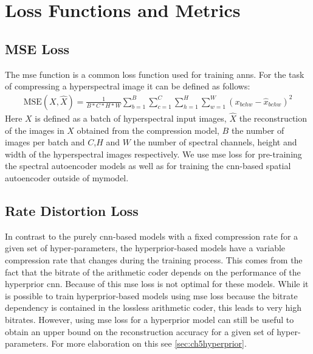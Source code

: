 \section{Loss Functions and Metrics}

\subsection{MSE Loss}
The \ac{mse} function is a common loss function used for training \acp{ann}. For the task of compressing a hyperspectral image it can be defined as follows:
\begin{align}
\text{MSE}(X,\hat{X}) = \frac{1}{B*C*H*W} \sum_{b=1}^{B}\sum_{c=1}^{C}\sum_{h=1}^H\sum_{w=1}^W (x_{bchw} - \hat{x}_{bchw})^2
\end{align}
Here $X$ is defined as a batch of hyperspectral input images, $\hat{X}$ the reconstruction of the images in $X$ obtained from the compression model, $B$ the number of images per batch and $C$,$H$ and $W$ the number of spectral channels, height and width of the hyperspectral images respectively.
We use \ac{mse} loss for pre-training the spectral autoencoder models as well as for training the \ac{cnn}-based spatial autoencoder outside of \ac{mymodel}.

\subsection{Rate Distortion Loss\label{sec:ch5ratedistortion}}
In contrast to the purely \ac{cnn}-based models with a fixed compression rate for a given set of hyper-parameters, the hyperprior-based models have a variable compression rate that changes during the training process. This comes from the fact that the bitrate of the arithmetic coder depends on the performance of the hyperprior \ac{cnn}. Because of this \ac{mse} loss is not optimal for these models. While it is possible to train hyperprior-based models using \ac{mse} loss because the bitrate dependency is contained in the lossless arithmetic coder, this leads to very high bitrates. However, using \ac{mse} loss for a hyperprior model can still be useful to obtain an upper bound on the reconstruction accuracy for a given set of hyper-parameters. For more elaboration on this see \autoref{sec:ch5hyperprior}.


